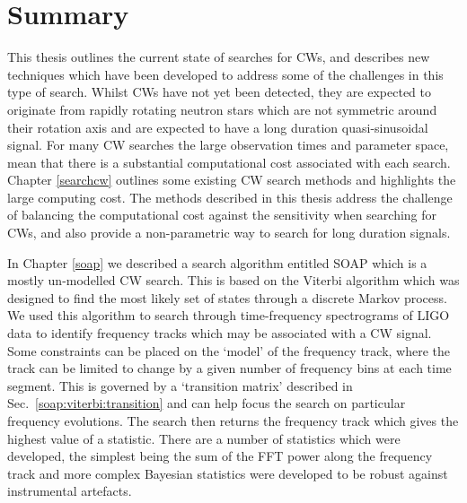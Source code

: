 \chapter{\label{summary}Summary}


This thesis outlines the current state of searches for \glspl{CW}, and
describes new techniques which have been developed to address some of the
challenges in this type of search.  Whilst \glspl{CW} have not yet been
detected, they are expected to originate from rapidly rotating neutron stars
which are not symmetric around their rotation axis and are expected to have a long duration
quasi-sinusoidal signal. For many
\gls{CW} searches the large observation times and parameter space, mean that
there is a substantial computational cost associated with each search.  Chapter
\ref{searchcw} outlines some existing \gls{CW} search methods and highlights
the large computing cost.  The methods described in this thesis address the
challenge of balancing the computational cost against the sensitivity when
searching for \glspl{CW}, and also provide a non-parametric way to search for long duration signals.

\bigskip

In Chapter \ref{soap} we described a search algorithm entitled SOAP which is a
mostly un-modelled \gls{CW} search.  This is based on the Viterbi algorithm
which was designed to find the most likely set of states through a discrete
Markov process.  We used this algorithm to search through
time-frequency spectrograms of \gls{LIGO} data to identify frequency tracks
which may be associated with a \gls{CW} signal.  Some constraints can be placed
on the `model' of the frequency track, where the track can be limited to change
by a given number of frequency bins at each time segment.  This is governed by
a `transition matrix' described in Sec.~\ref{soap:viterbi:transition} and can
help focus the search on particular frequency evolutions.  The search then
returns the frequency track which gives the highest value of a statistic.
There are a number of statistics which were developed, the simplest being the
sum of the \gls{FFT} power along the frequency track and more complex Bayesian
statistics were developed to be robust against instrumental artefacts.

